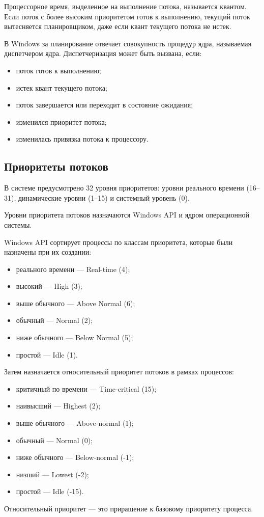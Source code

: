 \documentclass[a4paper,oneside,14pt]{extreport}
\begin{document}
Процессорное время, выделенное на выполнение потока, называется квантом. Если поток с более высоким приоритетом готов к выполнению, текущий поток вытесняется планировщиком, даже если квант текущего потока не истек.

В Windows за планирование отвечает совокупность процедур ядра, называемая диспетчером ядра. Диспетчеризация может быть вызвана, если:
\begin{itemize}
	\item поток готов к выполнению;
	\item истек квант текущего потока;
	\item поток завершается или переходит в состояние ожидания;
	\item изменился приоритет потока;
	\item изменилась привязка потока к процессору.
\end{itemize}

\subsection{Приоритеты потоков}

В системе предусмотрено 32 уровня приоритетов: уровни реального времени (16--31), динамические уровни (1--15) и системный уровень (0). 

Уровни приоритета потоков назначаются Windows API и ядром операционной системы.

Windows API сортирует процессы по классам приоритета, которые были назначены при их создании:
\begin{itemize}
	\item реального времени --- Real-time (4);
	\item высокий --- High (3);
	\item выше обычного --- Above Normal (6);
	\item обычный --- Normal (2);
	\item ниже обычного --- Below Normal (5);
	\item простой --- Idle (1).
\end{itemize}
Затем назначается относительный приоритет потоков в рамках процессов:
\begin{itemize}
	\item критичный по времени --- Time-critical (15);
	\item наивысший --- Highest (2);
	\item выше обычного --- Above-normal (1);
	\item обычный --- Normal (0);
	\item ниже обычного --- Below-normal (-1);
	\item низший --- Lowest (-2);
	\item простой --- Idle (-15).
\end{itemize}
Относительный приоритет --- это приращение к базовому приоритету процесса.
\end{document}
